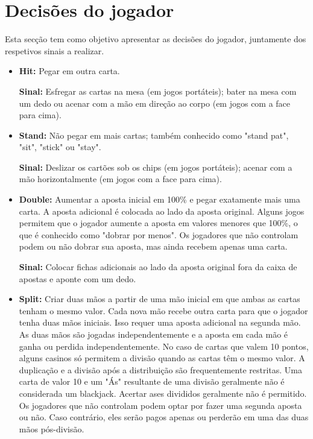 \documentclass{report}
\begin{document}
\section{Decisões do jogador}
Esta secção tem como objetivo apresentar as decisões do jogador, juntamente dos respetivos sinais a realizar.
\begin{itemize}
    \item \hypertarget{Decisões do jogador}{\textbf{Hit:} Pegar em outra carta.} \newline
\newline \textbf{Sinal:} Esfregar as cartas na mesa (em jogos portáteis); bater na mesa com um dedo ou acenar com a mão em direção ao corpo (em jogos com a face para cima).
    \item \hypertarget{Decisões do jogador}{\textbf{Stand:} Não pegar em mais cartas; também conhecido como "stand pat", "sit", "stick" ou "stay".} \newline
\newline \textbf{Sinal:} Deslizar os cartões sob os chips (em jogos portáteis); acenar com a mão horizontalmente (em jogos com a face para cima).
    \item \hypertarget{Decisões do jogador}{\textbf{Double:} Aumentar a aposta inicial em 100\% e pegar exatamente mais uma carta. A aposta adicional é colocada ao lado da aposta original. Alguns jogos permitem que o jogador aumente a aposta em valores menores que 100\%, o que é conhecido como "dobrar por menos". Os jogadores que não controlam podem ou não dobrar sua aposta, mas ainda recebem apenas uma carta.} \newline
\newline \textbf{Sinal:} Colocar fichas adicionais ao lado da aposta original fora da caixa de apostas e aponte com um dedo.
    \item \hypertarget{Decisões do jogador}{\textbf{Split:} Criar duas mãos a partir de uma mão inicial em que ambas as cartas tenham o mesmo valor. Cada nova mão recebe outra carta para que o jogador tenha duas mãos iniciais. Isso requer uma aposta adicional na segunda mão. As duas mãos são jogadas independentemente e a aposta em cada mão é ganha ou perdida independentemente. No caso de cartas que valem 10 pontos, alguns casinos só permitem a divisão quando as cartas têm o mesmo valor. A duplicação e a divisão após a distribuição são frequentemente restritas. Uma carta de valor 10 e um "Ás" resultante de uma divisão geralmente não é considerada um blackjack. Acertar ases divididos geralmente não é permitido. Os jogadores que não controlam podem optar por fazer uma segunda aposta ou não. Caso contrário, eles serão pagos apenas ou perderão em uma das duas mãos pós-divisão.}\newline

\end{itemize}
\end{document}
